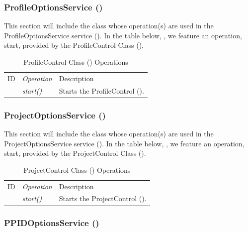 \documentclass[12pt,letterpaper]{article}
\begin{document}
\subsubsection{ProfileOptionsService ()}

This section will include the class whose operation(s) are used in the ProfileOptionsService service (). In the table below, , we feature an operation, start, provided by the ProfileControl Class ().

\begin{table}[H]
	\caption{ProfileControl Class () Operations} 
	\begin{tabu} to 
		\tableheader{}ID & Operation & Description \\
         & start() & Starts the ProfileControl (). \\
	\end{tabu}
\end{table}

\subsubsection{ProjectOptionsService ()}

This section will include the class whose operation(s) are used in the ProjectOptionsService service (). In the table below, , we feature an operation, start, provided by the ProjectControl Class ().

\begin{table}[H]
	\caption{ProjectControl Class () Operations} 
	\begin{tabu} to 
		\tableheader{}ID & Operation & Description \\
         & start() & Starts the ProjectControl (). \\
	\end{tabu}
\end{table}

\subsubsection{PPIDOptionsService ()}
\end{document}
